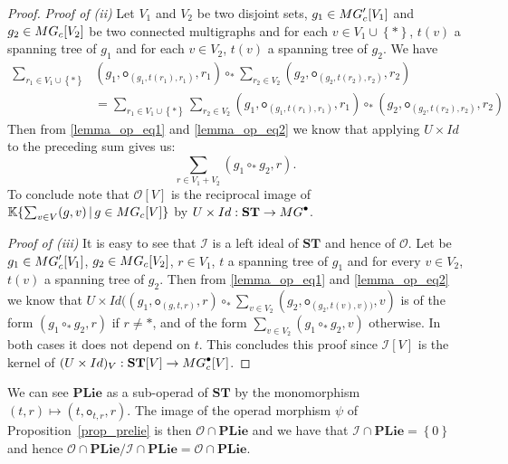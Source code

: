 \documentclass[11pt]{article}
\theoremstyle{definition}
\numberwithin{equation}{section}
\newcommand{\take}{\leftarrow}
\newcommand{\set}[1]{\left\{#1\right\}}
\newcommand{\spe}[1]{\normalfont{\textsc{#1}}}
\newcommand{\op}[1]{\mathbf{#1}}
\newcommand{\K}{\mathbb{K}}
\newcommand{\point}[1]{#1^{\bullet}}
\newcommand{\id}{Id}
\newcommand{\comp}[1][\ast]{\circ_{#1}}
\newcommand{\ori}{\texttt{o}}
\newcommand{\MG}{\spe{MG}}
\newcommand{\Operad}{\mathcal{O}}
\newcommand{\PLie}{\op{PLie}}
\newcommand{\ST}{\op{ST}}
\begin{document}
\begin{proof}
    {\em Proof of (ii)} Let $V_1$ and $V_2$ be two disjoint sets, $g_1\in \MG'_c[V_1]$ and $g_2\in \MG_c[V_2]$
    be two connected multigraphs and for each $v\in V_1\cup\set{\ast}$, $t(v)$ a spanning tree of $g_1$ and for 
    each $v\in V_2$, $t(v)$ a spanning tree of $g_2$. We have
    \begin{align}
        \sum_{r_1\in V_1\cup\set{\ast}} &(g_1,\ori_{(g_1,t(r_1),r_1)}, r_1) \comp \sum_{r_2\in V_2} (g_2,\ori_{(g_2,t(r_2),r_2)}, r_2) \\ \nonumber
        &= \sum_{r_1\in V_1\cup\set{\ast}}\sum_{r_2\in V_2} (g_1,\ori_{(g_1,t(r_1),r_1)}, r_1)\comp (g_2,\ori_{(g_2,t(r_2),r_2)}, r_2) 
    \end{align}
    Then from \eqref{lemma_op_eq1} and \eqref{lemma_op_eq2} we know that applying $U\times\id$ to the 
    preceding sum gives us:
    \begin{equation}
        \sum_{r\in V_1+V_2} (g_1\comp g_2,r).
    \end{equation}
    To conclude note that $\Operad[V]$ is the reciprocal image of $\K\{\sum_{v\in V}(g,v)\,|\,g\in \MG_c[V]\}$
    by  $U\times\id: \ST\rightarrow \point{\MG}$.

    {\em Proof of (iii)} It is easy to see that $\mathcal{I}$ is a left ideal of $\ST$ and hence of $\Operad$.
    Let be $g_1\in \MG'_c[V_1]$, $g_2\in \MG_c[V_2]$, $r\in V_1$, $t$ a spanning tree of $g_1$ and for every 
    $v\in V_2$, $t(v)$ a spanning tree of $g_2$. Then from \eqref{lemma_op_eq1} and \eqref{lemma_op_eq2} we 
    know that $U\times\id((g_1,\ori_{(g,t,r)}, r)\comp \sum_{v\in V_2} (g_2,\ori_{(g_2,t(v),v))}, v)$ is of the form
    $(g_1\comp g_2, r)$ if $r\not = \ast$, and of the form $\sum_{v\in V_2} (g_1\comp g_2, v)$ otherwise. In 
    both cases it does not depend on $t$. This concludes this proof since $\mathcal{I}[V]$ is the kernel of 
    $(U\times\id)_V: \ST[V]\rightarrow \MG_c^{\bullet}[V]$.
\end{proof}

We can see $\PLie$ as a sub-operad of $\ST$ by the monomorphism $(t,r)\mapsto (t, \ori_{t,r},r)$. The image of the
operad morphism $\psi$ of Proposition~\ref{prop_prelie} is then $\Operad\cap \PLie$ and we have that 
$\mathcal{I}\cap \PLie = \set{0}$ and hence $\Operad\cap \PLie/\mathcal{I}\cap \PLie = \Operad\cap \PLie$.
\end{document}
